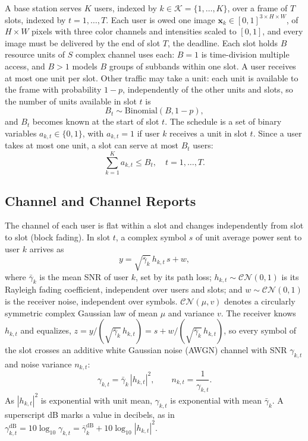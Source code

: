 A base station serves $K$ users, indexed by $k \in \mathcal{K} = \{1, \dots, K\}$, over a frame of
$T$ slots, indexed by $t = 1, \dots, T$. Each user is owed one image
$\mathbf{x}_k \in [0,1]^{3 \times H \times W}$, of $H \times W$ pixels with three color channels and
intensities scaled to $[0,1]$, and every image must be delivered by the end of slot $T$, the
deadline. Each slot holds $B$ resource units of $S$ complex channel uses each: $B = 1$ is
time-division multiple access, and $B > 1$ models $B$ groups of subbands within one slot. A user
receives at most one unit per slot. Other traffic may take a unit: each unit is available to the
frame with probability $1 - p$, independently of the other units and slots, so the number of
units available in slot $t$ is
\begin{equation}
B_t \sim \mathrm{Binomial}(B, 1 - p),
\label{eq:units}
\end{equation}
and $B_t$ becomes known at the start of slot $t$. The schedule is a set of binary variables
$a_{k,t} \in \{0, 1\}$, with $a_{k,t} = 1$ if user $k$ receives a unit in slot $t$. Since a user
takes at most one unit, a slot can serve at most $B_t$ users:
\begin{equation}
\sum_{k=1}^{K} a_{k,t} \le B_t, \quad t = 1, \dots, T.
\label{eq:capacity}
\end{equation}

\subsection{Channel and Channel Reports}
\label{sec:system-channel}

The channel of each user is flat within a slot and changes independently from slot to slot
(block fading). In slot $t$, a complex symbol $s$ of unit average power sent to user $k$ arrives
as
\begin{equation}
y = \sqrt{\bar\gamma_k}\, h_{k,t}\, s + w,
\label{eq:channel}
\end{equation}
where $\bar\gamma_k$ is the mean SNR of user $k$, set by its path loss;
$h_{k,t} \sim \mathcal{CN}(0, 1)$ is its Rayleigh fading coefficient, independent over users and
slots; and $w \sim \mathcal{CN}(0, 1)$ is the receiver noise, independent over symbols. $\mathcal{CN}(\mu, v)$ denotes a circularly symmetric complex Gaussian law of mean
$\mu$ and variance $v$. The receiver knows $h_{k,t}$ and equalizes,
$z = y / (\sqrt{\bar\gamma_k}\, h_{k,t}) = s + w / (\sqrt{\bar\gamma_k}\, h_{k,t})$, so every
symbol of the slot crosses an additive white Gaussian noise (AWGN) channel with SNR
$\gamma_{k,t}$ and noise variance $n_{k,t}$:
\begin{equation}
\gamma_{k,t} = \bar\gamma_k\, |h_{k,t}|^2, \qquad n_{k,t} = \frac{1}{\gamma_{k,t}}.
\label{eq:slot-snr}
\end{equation}
As $|h_{k,t}|^2$ is exponential with unit mean, $\gamma_{k,t}$ is exponential with mean
$\bar\gamma_k$. A superscript dB marks a value in decibels, as in
$\gamma^{\mathrm{dB}}_{k,t} = 10 \log_{10} \gamma_{k,t} = \bar\gamma^{\mathrm{dB}}_k +
10 \log_{10} |h_{k,t}|^2$.

